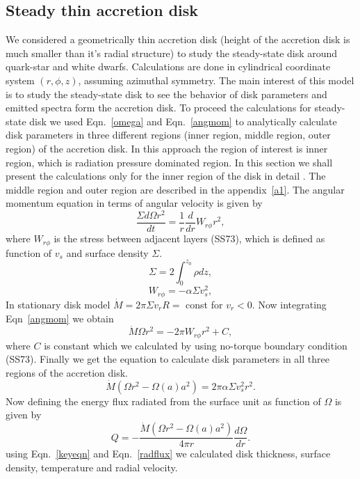 \documentclass[useAMS,usenatbib]{mn2e}
\begin{document}
\subsection{Steady thin accretion disk}
We considered a geometrically thin accretion disk (height of the accretion disk is much smaller than it's radial structure) to study the steady-state disk around quark-star and white dwarfs. Calculations are done in cylindrical coordinate system $(r,\phi,z)$, assuming azimuthal symmetry. The main interest of this model is to study the steady-state disk to see the behavior of disk parameters and emitted spectra form the accretion disk. To proceed the calculations for steady-state disk we used Eqn.~\ref{omega} and Eqn.~\ref{angmom} to analytically calculate disk parameters in three different regions (inner region, middle region, outer region) of the accretion disk. In this approach the region of interest is inner region, which is radiation pressure dominated region. In this section we shall present the calculations only for the inner region of the disk in detail . The middle region and outer region are described in the appendix~\ref{a1}. The angular momentum equation in terms of angular velocity is given by
\begin{equation}
\frac{\Sigma d\Omega r^2}{dt} = \frac{1}{r}\frac{d}{dr}W_{r\phi}r^2,
\label{angmom}
\end{equation}
where $W_{r\phi}$ is the stress between adjacent layers (SS73), which is defined as function of $v_s$ and surface density $\Sigma$.
\begin{equation}
\Sigma = 2\int_0^{z_0} \rho dz,
\end{equation}
\begin{equation}
W_{r\phi} = -\alpha\Sigma v_s^2,
\end{equation}
In stationary disk model $\dot{M} = 2\pi\Sigma v_r R =$ const for $v_r < 0$. Now integrating Eqn~\ref{angmom} we obtain
\begin{equation}
\dot{M}\Omega r^2 = -2\pi W_{r\phi}r^2 + C,
\label{const}
\end{equation}
where $C$ is constant which we calculated by using no-torque boundary condition (SS73). Finally we get the equation to calculate disk parameters in all three regions of the accretion disk.
\begin{equation}
\dot{M}\left(\Omega r^2 - \Omega(a)a^2\right) = 2\pi\alpha\Sigma v_s^2 r^2.
\label{keyeqn}
\end{equation}
Now defining the energy flux radiated from the surface unit as function of $\Omega$ is given by
\begin{equation}
Q = -\frac{\dot{M}\left(\Omega r^2 - \Omega(a)a^2\right)}{4\pi r}\frac{d\Omega}{dr}.
\label{radflux}
\end{equation}
using Eqn.~\ref{keyeqn} and Eqn.~\ref{radflux} we calculated disk thickness, surface density, temperature and radial velocity.
\end{document}
